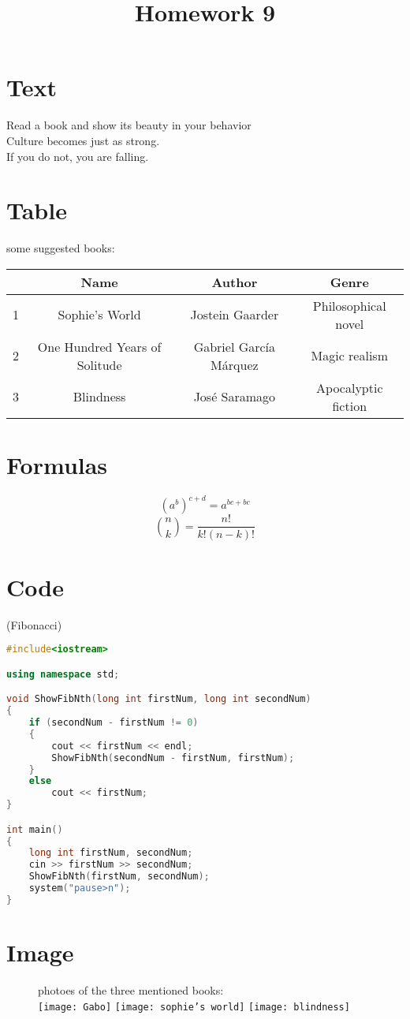 \documentclass[12pt]{article}
\begin{document}
\title{Homework 9}
\maketitle
\section{Text}
Read a book and show its beauty in your behavior\\
Culture becomes just as strong.\\
If you do not, you are falling.\\
\section{Table}
\begin{table}[h]
    \begin{center}
         some suggested books: \\
         \begin{tabular}{|c|c|c|c|}
           \hline
           \textbf{} & \textbf{Name} & \textbf{Author}&\textbf{Genre}\\
           \hline
           1 & Sophie's World & Jostein Gaarder & Philosophical novel \\
           \hline
           2 & One Hundred Years of Solitude & Gabriel García Márquez & Magic realism \\
           \hline
           3 & Blindness & José Saramago & Apocalyptic fiction \\
           \hline
        \end{tabular}
     \end{center}
\end{table}
\section{Formulas}
\[ (a^b)^{c+d} = a^{bc+bc}  \]
\[
    \binom{n}{k} = \frac{n!}{k!(n-k)!}
\]




\section{Code}
  (Fibonacci)\\
  \begin{lstlisting}[language=C++]
  #include<iostream>

using namespace std;

void ShowFibNth(long int firstNum, long int secondNum)
{
	if (secondNum - firstNum != 0)
	{
		cout << firstNum << endl;
		ShowFibNth(secondNum - firstNum, firstNum);
	}
	else
		cout << firstNum;
}

int main()
{
	long int firstNum, secondNum;
	cin >> firstNum >> secondNum;
	ShowFibNth(firstNum, secondNum);
	system("pause>n");
}
  \end{lstlisting}

\section{Image}
\begin{figure}
  \centering
  photoes of the three  mentioned books:\\
  \texttt{[image: Gabo]}
  \texttt{[image: sophie's world]}
  \texttt{[image: blindness]}
\end{figure}
\end{document}
